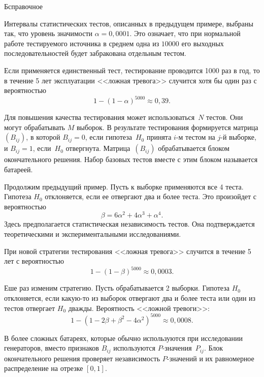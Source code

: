 \begin{appendix}{Б}{справочное}
\begin{example}
Интервалы статистических тестов, описанных в предыдущем примере,
выбраны так, что уровень значимости $\alpha=0,0001$.
%
Это означает, что при нормальной работе тестируемого источника
в среднем одна из $10000$ его выходных последовательностей
будет забракована отдельным тестом. 

Если применяется единственный тест,
тестирование проводится 1000 раз в год, 
то в течение 5 лет эксплуатации <<ложная тревога>>
случится хотя бы один раз с вероятностью
$$
1-(1-\alpha)^{5000}\approx 0,39.
$$
\end{example}

Для повышения качества тестирования может использоваться~$N$ 
тестов. Они могут обрабатывать $M$ выборок. В результате
тестирования формируется матрица $(B_{ij})$, в которой $B_{ij}=0$,
если гипотеза~$H_0$ принята $i$-м тестом на $j$-й выборке,
и $B_{ij}=1$, если~$H_0$ отвергнута.
%
Матрица~$(B_{ij})$ обрабатывается блоком окончательного решения. 
Набор базовых тестов вместе с этим блоком называется батареей.

\begin{example}
Продолжим предыдущий пример. Пусть к выборке применяются 
все 4 теста. Гипотеза $H_0$ отклоняется, если ее отвергают 
два и более теста. Это произойдет с вероятностью
$$
\beta=6\alpha^2 + 4 \alpha^3 + \alpha^4.
$$
Здесь предполагается статистическая независимость тестов.
Она подтверждается теоретическими и экспериментальными 
исследованиями.

При новой стратегии тестирования <<ложная тревога>>
случится в течение 5 лет с вероятностью
$$
1-(1-\beta)^{5000}\approx 0,0003.
$$

Еше раз изменим стратегию. Пусть обрабатывается 2 выборки.
Гипотеза $H_0$ отклоняется, если какую-то из выборок отвергают 
два и более теста или один из тестов отвергает $H_0$ дважды.
%
Вероятность <<ложной тревоги>>:
$$
1-(1-2\beta+\beta^2-4\alpha^2)^{5000}\approx 0,0008.
$$
\end{example}

В более сложных батареях, которые обычно используются при исследовании
генераторов, вместо признаков $B_{ij}$ используются $P$-значения~$P_{ij}$.
%
Блок окончательного решения проверяет независимость $P$-значений
и их равномерное распределение на отрезке $[0,1]$.

\end{appendix}
